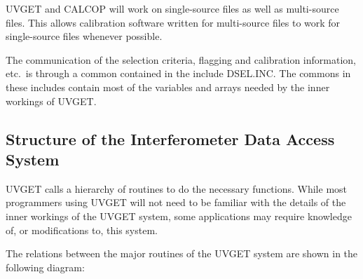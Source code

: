 UVGET and CALCOP will work on single-source
files as well as multi-source files.  This allows calibration software
written for multi-source files to work for single-source files
whenever possible.

The communication of the selection criteria, flagging and calibration
information, etc.~is through a common contained in the include
DSEL.INC.  The commons in these includes contain most of
the variables and arrays needed by the inner workings of UVGET.

\subsection{Structure of the Interferometer Data Access System }
UVGET calls a hierarchy of routines to do the necessary functions.
While most programmers using UVGET will not need to be familiar with
the details of the inner workings of the UVGET system, some
applications may require knowledge of, or modifications to, this
system.

The relations between the major routines of the UVGET system are shown
in the following diagram:


